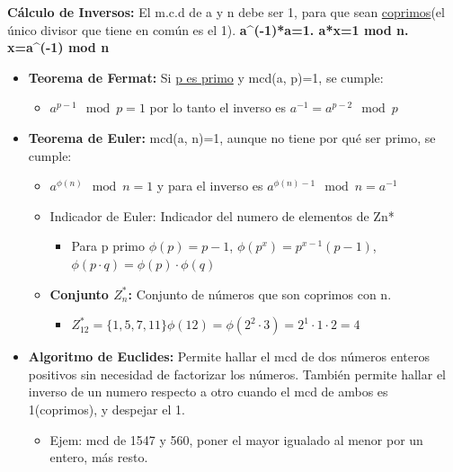 \documentclass[12pt, twoside, openright]{report} %
\begin{document}
  
  \textbf{Cálculo de Inversos:} El m.c.d de a y n debe ser 1, para que
  sean \underline{coprimos}(el único divisor que tiene en común es el
  1). \textbf{a\^{}(-1)*a=1. a*x=1 mod n. x=a\^{}(-1) mod n}
  

  \begin{itemize}
  \item \textbf{Teorema de Fermat:} Si \underline{p es primo} y mcd(a, p)=1,
    se cumple:
    

    \begin{itemize}
    \item $a^{p-1} \mod p = 1$ por lo tanto el inverso es $a^{-1} = a^{p-2} \mod p$
      
    \end{itemize}
  \item \textbf{Teorema de Euler:} mcd(a, n)=1, aunque no tiene por qué ser
    primo, se cumple:
    

    \begin{itemize}
    \item $a^{\phi(n)} \mod n = 1$ y para el inverso es $a^{\phi(n)-1} \mod n = a^{-1}$
      
    \item Indicador de Euler: Indicador del numero de elementos de Zn*
    \begin{itemize}
		\item Para p primo $\phi(p)=p-1$, $\phi(p^x)=p^{x-1}(p-1)$, $\phi(p\cdot q) = \phi(p)\cdot\phi(q)$
	\end{itemize}
      
    \item \textbf{Conjunto $Z_n^*$:} Conjunto de números que son coprimos con n.
      

      \begin{itemize}
      \item
        
		$Z_{1 2}^* = \{ 1, 5, 7, 11\} \phi(12) = \phi(2^2\cdot 3)=2^1 \cdot 1 \cdot 2 = 4$
        
      \end{itemize}
    \end{itemize}
  \item \textbf{Algoritmo de Euclides:} Permite hallar el mcd de dos números
    enteros positivos sin necesidad de factorizar los números. También
    permite hallar el inverso de un numero respecto a otro cuando el mcd
    de ambos es 1(coprimos), y despejar el 1.
    

    \begin{itemize}
    \item Ejem: mcd de 1547 y 560, poner el mayor igualado al menor por un
      entero, más resto.
      

\end{itemize}
\end{itemize}
\end{document}
